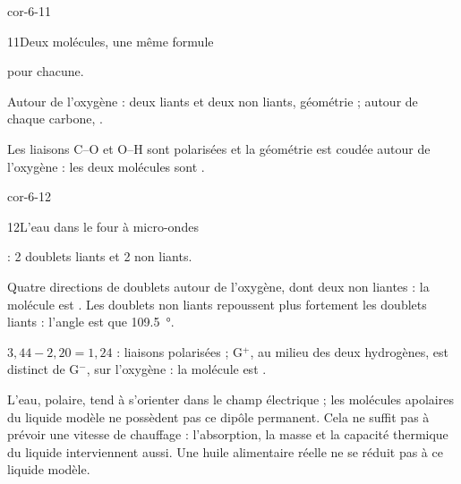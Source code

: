 \begin{blocLivre}{cor-6-11}
\begin{corrige}{11}{Deux molécules, une même formule}
\begin{questions}
\item {} pour chacune.
\item {} \qquad {}
\item Autour de l'oxygène : deux liants et deux non liants, géométrie  ; autour de chaque carbone,
.
\item Les liaisons C--O et O--H sont polarisées et la géométrie est coudée autour de l'oxygène : les deux molécules sont
.
\end{questions}
\end{corrige}
\end{blocLivre}
\begin{blocLivre}{cor-6-12}
\begin{corrige}{12}{L'eau dans le four à micro-ondes}
\begin{questions}
\item {} : 2 doublets liants et 2 non liants.
\item Quatre directions de doublets autour de l'oxygène, dont deux non liantes : la molécule est . Les doublets non
liants repoussent plus fortement les doublets liants : l'angle est  que \qty{109,5}{\degree}.
\item $3{,}44-2{,}20=1{,}24$ : liaisons polarisées ; G$^{+}$, au milieu des deux hydrogènes, est distinct de G$^{-}$, sur l'oxygène :
la molécule est .
\item L'eau, polaire, tend à s'orienter dans le champ électrique ; les molécules apolaires du liquide modèle ne possèdent pas ce
dipôle permanent. Cela ne suffit pas à prévoir une vitesse de chauffage : l'absorption, la masse et la capacité thermique du
liquide interviennent aussi. Une huile alimentaire réelle ne se réduit pas à ce liquide modèle.
\end{questions}
\end{corrige}
\end{blocLivre}
